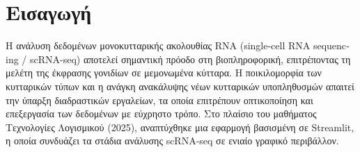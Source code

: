 \chapter{Εισαγωγή}

Η ανάλυση δεδομένων μονοκυτταρικής ακολουθίας \foreignlanguage{english}{RNA} \foreignlanguage{english}{(single-cell RNA sequencing / scRNA-seq)} αποτελεί σημαντική πρόοδο στη βιοπληροφορική, επιτρέποντας τη μελέτη της έκφρασης γονιδίων σε μεμονωμένα κύτταρα. Η ποικιλομορφία των κυτταρικών τύπων και η ανάγκη ανακάλυψης νέων κυτταρικών υποπληθυσμών απαιτεί την ύπαρξη διαδραστικών εργαλείων, τα οποία επιτρέπουν οπτικοποίηση και επεξεργασία των δεδομένων με εύχρηστο τρόπο. Στο πλαίσιο του μαθήματος Τεχνολογίες Λογισμικού (2025), αναπτύχθηκε μια εφαρμογή βασισμένη σε \foreignlanguage{english}{Streamlit}, η οποία συνδυάζει τα στάδια ανάλυσης \foreignlanguage{english}{scRNA-seq} σε ενιαίο γραφικό περιβάλλον.